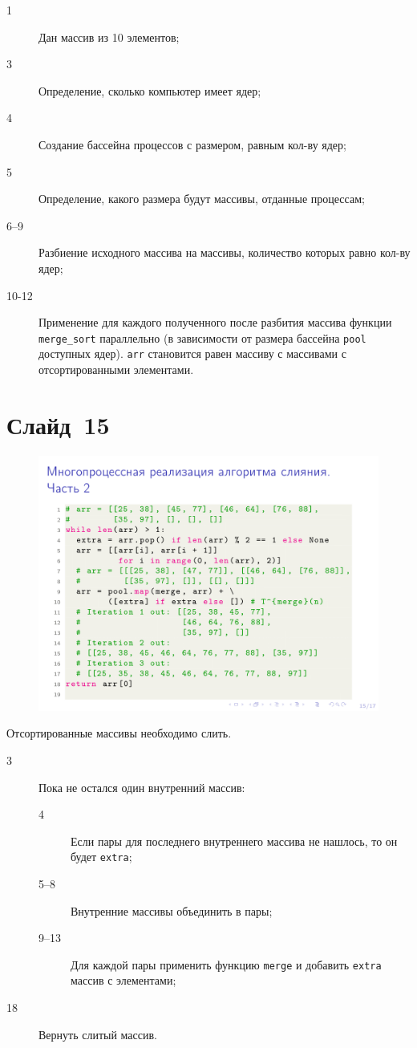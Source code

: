\documentclass[aps,pre,reprint]{revtex4-2}
\begin{document}
	\begin{description}
		\item[1] Дан массив из 10 элементов;
		\item[3] Определение, сколько компьютер имеет ядер;
		\item[4] Создание бассейна процессов с размером, равным кол-ву ядер;
		\item[5] Определение, какого размера будут массивы, отданные процессам;
		\item[6--9] Разбиение исходного массива на массивы, количество которых равно кол-ву ядер;
		\item[10-12] Применение для каждого полученного после разбития массива функции \verb*|merge_sort| параллельно (в зависимости от размера бассейна \verb*|pool| доступных ядер). \verb*|arr| становится равен массиву с массивами с отсортированными элементами.
	\end{description}

	\section{Слайд~15}
	\begin{figure}[H]
		\includegraphics[scale=.7]{presentation-15.png}
	\end{figure}
	
	Отсортированные массивы необходимо слить.
	
	\begin{description}
		\item[3] Пока не остался один внутренний массив:
		\begin{description}
			\item[4] Если пары для последнего внутреннего массива не нашлось, то он будет \verb*|extra|;
			\item[5--8] Внутренние массивы объединить в пары;
			\item[9--13] Для каждой пары применить функцию \verb*|merge| и добавить \verb*|extra| массив с элементами;
		\end{description}
		\item[18] Вернуть слитый массив.
	\end{description}
\end{document}
